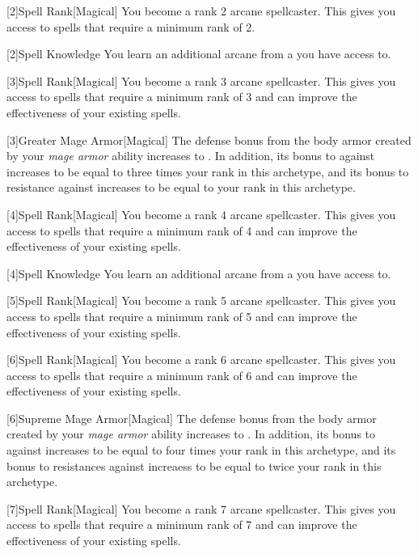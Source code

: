         [2]{Spell Rank}[Magical] You become a rank 2 arcane spellcaster.
        This gives you access to spells that require a minimum rank of 2.

        [2]{Spell Knowledge} You learn an additional arcane  from a  you have access to.

        [3]{Spell Rank}[Magical] You become a rank 3 arcane spellcaster.
        This gives you access to spells that require a minimum rank of 3 and can improve the effectiveness of your existing spells.

        [3]{Greater Mage Armor}[Magical]
        The defense bonus from the body armor created by your \textit{mage armor} ability increases to .
        In addition, its bonus to  against  increases to be equal to three times your rank in this archetype, and its bonus to resistance against  increases to be equal to your rank in this archetype.

        [4]{Spell Rank}[Magical] You become a rank 4 arcane spellcaster.
        This gives you access to spells that require a minimum rank of 4 and can improve the effectiveness of your existing spells.

        [4]{Spell Knowledge} You learn an additional arcane  from a  you have access to.

        [5]{Spell Rank}[Magical] You become a rank 5 arcane spellcaster.
        This gives you access to spells that require a minimum rank of 5 and can improve the effectiveness of your existing spells.

        [6]{Spell Rank}[Magical] You become a rank 6 arcane spellcaster.
        This gives you access to spells that require a minimum rank of 6 and can improve the effectiveness of your existing spells.

        [6]{Supreme Mage Armor}[Magical]
        The defense bonus from the body armor created by your \textit{mage armor} ability increases to .
        In addition, its bonus to  against  increases to be equal to four times your rank in this archetype, and its bonus to resistances against  increaess to be equal to twice your rank in this archetype.

        [7]{Spell Rank}[Magical] You become a rank 7 arcane spellcaster.
        This gives you access to spells that require a minimum rank of 7 and can improve the effectiveness of your existing spells.

